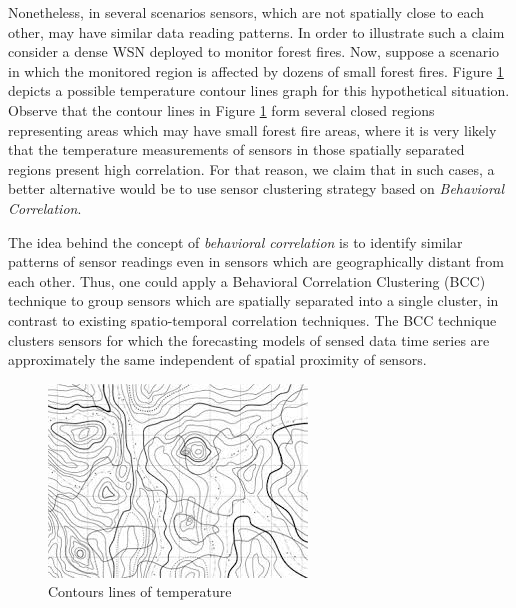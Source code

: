 \documentclass[conference]{IEEEtran}
\begin{document}
Nonetheless, in several scenarios sensors, which are not spatially close to each
other, may have similar data reading patterns. In order to illustrate such a
claim consider a dense WSN deployed to monitor forest fires. 
Now, suppose a scenario in which the monitored region is affected by dozens of
small forest fires. Figure \ref{fig:contour_lines} depicts a possible temperature
contour lines graph for this hypothetical situation. Observe that the contour
lines in Figure \ref{fig:contour_lines} form several closed regions representing
areas which may have small forest fire areas, where it is very likely that the
temperature measurements of sensors in those spatially separated regions present
high correlation. For that reason, we claim that in such cases, a better
alternative would be to use sensor clustering strategy based on
\textit{Behavioral Correlation}.

The idea behind the concept of {\it behavioral correlation} is to identify
similar patterns of sensor readings even in sensors which are geographically
distant from each other. Thus, one could apply a Behavioral Correlation
Clustering (BCC) technique to group sensors which are spatially separated into a
single cluster, in contrast to existing spatio-temporal correlation techniques.
The BCC technique clusters sensors for which the forecasting models of sensed
data time series are approximately the same independent of spatial proximity of
sensors.




\begin{figure}[!htb]
\centering
	\includegraphics[scale=0.7]{I2.png}
    \caption{Contours lines of temperature}
    \label{fig:contour_lines}
\end{figure}
\end{document}
